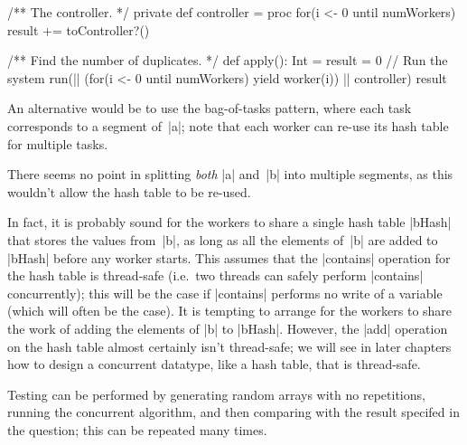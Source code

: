 \begin{nontuteanswer}
\begin{scala}
{  /** The controller. */
  private def controller = proc{
    for(i <- 0 until numWorkers) result += toController?()
  }

  /** Find the number of duplicates. */
  def apply(): Int = {
    result = 0
    // Run the system
    run(|| (for(i <- 0 until numWorkers) yield worker(i)) || controller)
    result
  }	
}
\end{scala}

An alternative would be to use the bag-of-tasks pattern, where each task
corresponds to a segment of~|a|; note that each worker can re-use its hash
table for multiple tasks. 

There seems no point in splitting \emph{both} |a| and~|b| into multiple
segments, as this wouldn't allow the hash table to be re-used.  

In fact, it is probably sound for the workers to share a single hash table
|bHash| that stores the values from~|b|, as long as all the elements of~|b| are
added to |bHash| before any worker starts.  This assumes that the |contains|
operation for the hash table is thread-safe (i.e.~two threads can safely perform
|contains| concurrently); this will be the case if |contains| performs no
write of a variable (which will often be the case).  It is tempting to arrange
for the workers to share the work of adding the elements of |b| to |bHash|.
However, the |add| operation on the hash table almost certainly isn't
thread-safe; we will see in later chapters how to design a concurrent
datatype, like a hash table, that is thread-safe. 

Testing can be performed by generating random arrays with no repetitions,
running the concurrent algorithm, and then comparing with the result specifed
in the question; this can be repeated many times.
\end{nontuteanswer}




